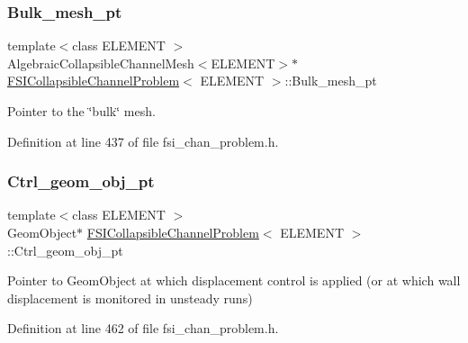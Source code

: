 \subsubsection{\texorpdfstring{Bulk\+\_\+mesh\+\_\+pt}{Bulk\_mesh\_pt}}
{\footnotesize\ttfamily template$<$class E\+L\+E\+M\+E\+NT $>$ \\
Algebraic\+Collapsible\+Channel\+Mesh$<$E\+L\+E\+M\+E\+NT$>$$\ast$ \hyperlink{classFSICollapsibleChannelProblem}{F\+S\+I\+Collapsible\+Channel\+Problem}$<$ E\+L\+E\+M\+E\+NT $>$\+::Bulk\+\_\+mesh\+\_\+pt\hspace{0.3cm}{\ttfamily [protected]}}



Pointer to the \char`\"{}bulk\char`\"{} mesh. 



Definition at line 437 of file fsi\+\_\+chan\+\_\+problem.\+h.

\mbox{\label{classFSICollapsibleChannelProblem_a0af9dba0fa399669d099b67b8c6906fa}} 
\subsubsection{\texorpdfstring{Ctrl\+\_\+geom\+\_\+obj\+\_\+pt}{Ctrl\_geom\_obj\_pt}}
{\footnotesize\ttfamily template$<$class E\+L\+E\+M\+E\+NT $>$ \\
Geom\+Object$\ast$ \hyperlink{classFSICollapsibleChannelProblem}{F\+S\+I\+Collapsible\+Channel\+Problem}$<$ E\+L\+E\+M\+E\+NT $>$\+::Ctrl\+\_\+geom\+\_\+obj\+\_\+pt\hspace{0.3cm}{\ttfamily [protected]}}

Pointer to Geom\+Object at which displacement control is applied (or at which wall displacement is monitored in unsteady runs) 

Definition at line 462 of file fsi\+\_\+chan\+\_\+problem.\+h.

\mbox{\label{classFSICollapsibleChannelProblem_afc33ee9a23af728b98ed73623b65e1ac}} 
